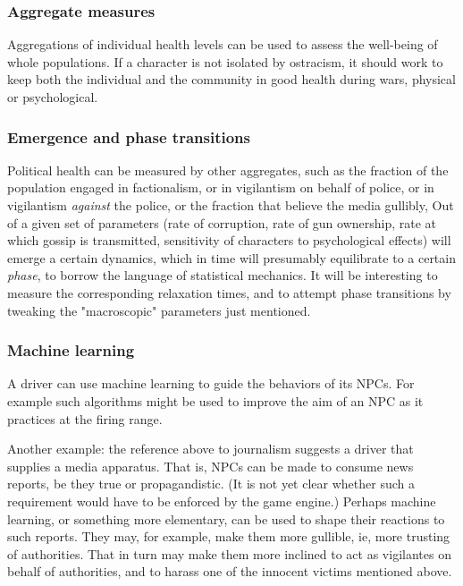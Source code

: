 \subsubsection{Aggregate measures}

Aggregations of individual health levels can be used to assess the well-being
of whole populations.
If a character is not isolated by ostracism, it should work to keep both the
individual and the community in good health during wars, physical or
psychological.

\subsubsection{Emergence and phase transitions}

Political health can be measured by other aggregates, such as the fraction of
the population engaged in factionalism, or in vigilantism on behalf of police,
or in vigilantism {\em against} the police, or the fraction that believe the
media gullibly, \etc\@
Out of a given set of parameters (rate of corruption, rate of gun ownership,
rate at which gossip is transmitted, sensitivity of characters to
psychological effects) will emerge a certain dynamics, which
in time will presumably equilibrate to a certain {\em phase}, to borrow the
language of statistical mechanics.
It will be interesting to measure the corresponding relaxation
times, and to attempt phase transitions by tweaking the "macroscopic"
parameters just mentioned.

\subsubsection{Machine learning}

A driver can use machine learning
to guide the behaviors of its NPCs. For example such algorithms
might be used to improve the aim of an NPC as it practices at the firing range.

Another example: the reference above to journalism suggests a driver
that supplies a media apparatus.
That is, NPCs can be made to consume news
reports, be they true or propagandistic. (It is not yet clear whether
such a requirement would have to be enforced by the game engine.) Perhaps
machine learning, or something more elementary, can be used to shape their
reactions to such reports.
They may, for example, make them more gullible,
ie, more trusting of authorities.
That in turn may make them more inclined
to act as vigilantes on behalf of authorities, and to harass one of the
innocent victims mentioned above.

